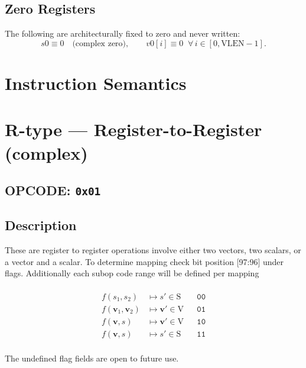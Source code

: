 \documentclass[10pt]{article}
\begin{document}
\subsection*{Zero Registers}
\noindent The following are architecturally fixed to zero and never written:
\[
s0 \equiv 0\quad\text{(complex zero)}, \qquad
v0[i] \equiv 0\;\; \forall\, i \in [0,\mathrm{VLEN}-1].
\]

\clearpage
\section*{Instruction Semantics}

\section*{R-type — Register-to-Register (complex)}
\subsection*{OPCODE: \texttt{0x01}}
\subsection*{Description}


These are register to register operations involve either two vectors, two scalars, or a vector and a scalar. To determine mapping check bit position [97:96] under flags. Additionally each subop code range will be defined per mapping\\\\

\[
\begin{aligned}
f(s_1,s_2)                 &\mapsto s' \in \mathrm{S}            && \texttt{00} \\
f(\mathbf v_1,\mathbf v_2) &\mapsto \mathbf v' \in \mathrm{V}    && \texttt{01} \\
f(\mathbf v,s)             &\mapsto \mathbf v' \in \mathrm{V}    && \texttt{10} \\
f(\mathbf v,s)             &\mapsto s' \in \mathrm{S}            && \texttt{11} \\
\end{aligned}
\]



The undefined flag fields are open to future use. 
\end{document}
